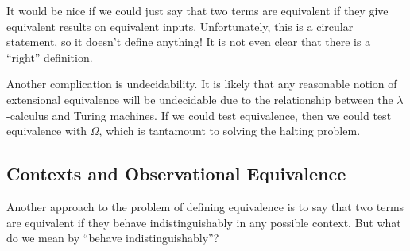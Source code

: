 It would be nice if we could just say that two terms are equivalent if
they give equivalent results on equivalent inputs. Unfortunately, this
is a circular statement, so it doesn't define anything!  It is not
even clear that there is a ``right'' definition.

Another complication is undecidability. It is likely that any
reasonable notion of extensional equivalence will be undecidable due
to the relationship between the $\lambda$-calculus and Turing
machines. If we could test equivalence, then we could test equivalence
with $\Omega$, which is tantamount to solving the halting problem.


%

%

\subsection{Contexts and Observational Equivalence}

Another approach to the problem of defining equivalence is to say that
two terms are equivalent if they behave indistinguishably in any
possible context.  But what do we mean by ``behave
indistinguishably''?

